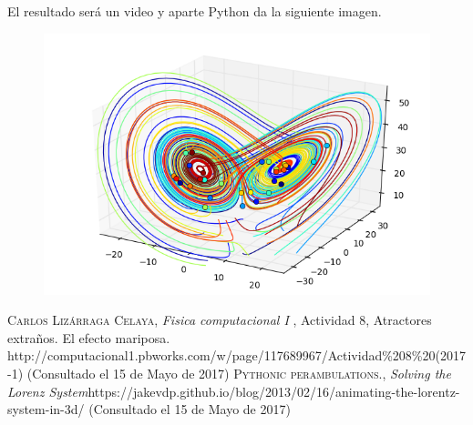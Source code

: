El resultado será un video y aparte Python da la siguiente imagen. 
\begin{figure}[ht!]
\centering
\includegraphics[scale=0.75]{2.png}
\end{figure}

\begin{thebibliography}{X}
 \textsc{Carlos Lizárraga Celaya},
\textit{Fisica computacional I }, Actividad 8,
Atractores extraños. El efecto mariposa. http://computacional1.pbworks.com/w/page/117689967/Actividad\%208\%20(2017-1) (Consultado el 15 de Mayo de 2017)
 \textsc{Pythonic perambulations.},
\textit{Solving the Lorenz System}https://jakevdp.github.io/blog/2013/02/16/animating-the-lorentz-system-in-3d/ (Consultado el 15 de Mayo de 2017)
\end{thebibliography}




